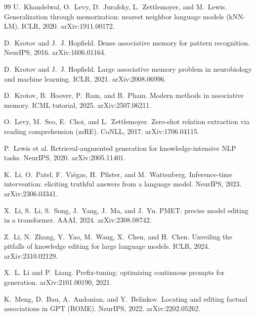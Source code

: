 \documentclass[11pt]{article}
\theoremstyle{remark}
\begin{document}
\begin{thebibliography}{99}
U.~Khandelwal, O.~Levy, D.~Jurafsky, L.~Zettlemoyer, and M.~Lewis.
\newblock Generalization through memorization: nearest neighbor language models (kNN-LM).
\newblock ICLR, 2020. arXiv:1911.00172.

D.~Krotov and J.~J. Hopfield.
\newblock Dense associative memory for pattern recognition.
\newblock NeurIPS, 2016. arXiv:1606.01164.

D.~Krotov and J.~J. Hopfield.
\newblock Large associative memory problem in neurobiology and machine learning.
\newblock ICLR, 2021. arXiv:2008.06996.

D.~Krotov, B.~Hoover, P.~Ram, and B.~Pham.
\newblock Modern methods in associative memory.
\newblock ICML tutorial, 2025. arXiv:2507.06211.

O.~Levy, M.~Seo, E.~Choi, and L.~Zettlemoyer.
\newblock Zero-shot relation extraction via reading comprehension (zsRE).
\newblock CoNLL, 2017. arXiv:1706.04115.

P.~Lewis et al.
\newblock Retrieval-augmented generation for knowledge-intensive NLP tasks.
\newblock NeurIPS, 2020. arXiv:2005.11401.

K.~Li, O.~Patel, F.~Vi\'egas, H.~Pfister, and M.~Wattenberg.
\newblock Inference-time intervention: eliciting truthful answers from a language model.
\newblock NeurIPS, 2023. arXiv:2306.03341.

X.~Li, S.~Li, S.~Song, J.~Yang, J.~Ma, and J.~Yu.
\newblock PMET: precise model editing in a transformer.
\newblock AAAI, 2024. arXiv:2308.08742.

Z.~Li, N.~Zhang, Y.~Yao, M.~Wang, X.~Chen, and H.~Chen.
\newblock Unveiling the pitfalls of knowledge editing for large language models.
\newblock ICLR, 2024. arXiv:2310.02129.

X.~L. Li and P.~Liang.
\newblock Prefix-tuning: optimizing continuous prompts for generation.
\newblock arXiv:2101.00190, 2021.

K.~Meng, D.~Bau, A.~Andonian, and Y.~Belinkov.
\newblock Locating and editing factual associations in GPT (ROME).
\newblock NeurIPS, 2022. arXiv:2202.05262.


\end{thebibliography}
\end{document}
